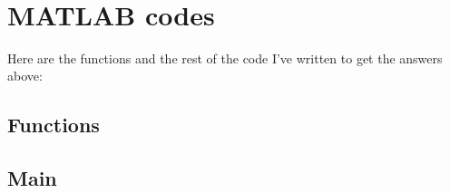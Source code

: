 \documentclass[12pt,oneside,reqno]{article}
\theoremstyle{definition}
\theoremstyle{definition}
\theoremstyle{definition}
\theoremstyle{definition}
\theoremstyle{definition}
\theoremstyle{definition}
\theoremstyle{definition}
\theoremstyle{definition}
\theoremstyle{definition}
\begin{document}
\newpage\

\section{MATLAB codes}

Here are the functions and the rest of the code I've written to get the answers above:

\subsection{Functions}






\subsection{Main}

\end{document}
